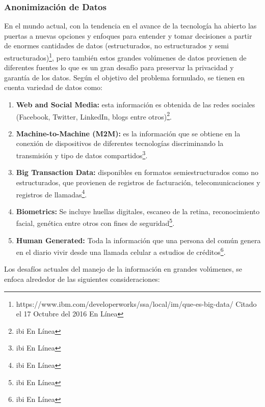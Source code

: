 \documentclass[a4paper,openright,12pt]{book}
\theoremstyle{definition}
\theoremstyle{remark}
\begin{document}
    	\subsubsection{Anonimización de Datos}
En el mundo actual, con la tendencia en el avance de la tecnología ha abierto las puertas a nuevas opciones y enfoques para entender y tomar decisiones a partir de enormes cantidades de datos (estructurados, no estructurados y semi estructurados)\footnote{https://www.ibm.com/developerworks/ssa/local/im/que-es-big-data/ Citado el 17 Octubre del 2016 En Línea}, pero también estos grandes volúmenes de datos provienen de diferentes fuentes lo que es un gran desafío para preservar la privacidad y garantía de los datos. Según el objetivo del problema formulado, se tienen  en cuenta variedad de datos como:
\begin{enumerate}
	\item \textbf{Web and Social Media:} esta información es obtenida de las redes sociales (Facebook, Twitter, LinkedIn, blogs entre otros)\footnote{ibi En Línea}.
    \item \textbf{Machine-to-Machine (M2M):} es la información que se obtiene en la conexión de dispositivos de diferentes tecnologías discriminando la transmisión y tipo de datos compartidos\footnote{ibi En Línea}.
    \item \textbf{Big Transaction Data:} disponibles en formatos semiestructurados como no estructurados, que provienen de registros de facturación, telecomunicaciones y registros de llamadas\footnote{ibi En Línea}.
     \item \textbf{Biometrics:} Se incluye huellas digitales, escaneo de la retina, reconocimiento facial, genética entre otros con fines de seguridad\footnote{ibi En Línea}.
     \item \textbf{Human Generated:} Toda la información que una persona del común genera en el diario vivir desde una llamada celular a estudios de créditos\footnote{ibi En Línea}.
\end{enumerate}
Los desafíos actuales del manejo de la información en grandes volúmenes, se enfoca alrededor de las siguientes consideraciones:
\end{document}
